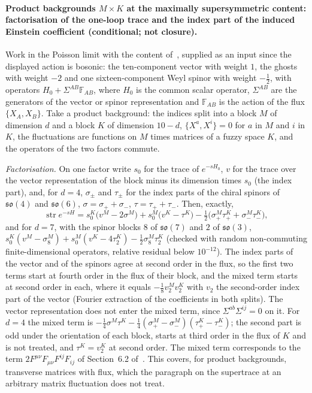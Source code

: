 \paragraph{Product backgrounds \(M\times K\) at the maximally supersymmetric content: factorisation of the one-loop trace and the index part of the induced Einstein coefficient (conditional; not closure).}
Work in the Poisson limit with the content of~\cite{IKKT1997}, supplied as an input since the displayed action is bosonic: the ten-component vector with weight \(1\), the ghosts with weight \(-2\) and one sixteen-component Weyl spinor with weight \(-\tfrac12\), with operators \(H_0+\Sigma^{AB}\mathbb F_{AB}\), where \(H_0\) is the common scalar operator, \(\Sigma^{AB}\) are the generators of the vector or spinor representation and \(\mathbb F_{AB}\) is the action of the flux \(\{X_A,X_B\}\). Take a product background: the indices split into a block \(M\) of dimension \(d\) and a block \(K\) of dimension \(10-d\), \(\{X^a,X^i\}=0\) for \(a\) in \(M\) and \(i\) in \(K\), the fluctuations are functions on \(M\) times matrices of a fuzzy space \(K\), and the operators of the two factors commute.

\emph{Factorisation.} On one factor write \(s_0\) for the trace of \(e^{-sH_0}\), \(v\) for the trace over the vector representation of the block minus its dimension times \(s_0\) (the index part), and, for \(d=4\), \(\sigma_\pm\) and \(\tau_\pm\) for the index parts of the chiral spinors of \(\mathfrak{so}(4)\) and \(\mathfrak{so}(6)\), \(\sigma=\sigma_++\sigma_-\), \(\tau=\tau_++\tau_-\). Then, exactly,
\[
  \operatorname{str}e^{-sH}=s_0^K\bigl(v^M-2\sigma^M\bigr)+s_0^M\bigl(v^K-\tau^K\bigr)-\tfrac12\bigl(\sigma_+^M\tau_+^K+\sigma_-^M\tau_-^K\bigr),
\]
and for \(d=7\), with the spinor blocks \(8\) of \(\mathfrak{so}(7)\) and \(2\) of \(\mathfrak{so}(3)\), \(s_0^K(v^M-\sigma_8^M)+s_0^M(v^K-4\tau_2^K)-\tfrac12\sigma_8^M\tau_2^K\) (checked with random non-commuting finite-dimensional operators, relative residual below \(10^{-12}\)). The index parts of the vector and of the spinors agree at second order in the flux, so the first two terms start at fourth order in the flux of their block, and the mixed term starts at second order in each, where it equals \(-\tfrac18v_2^Mv_2^K\) with \(v_2\) the second-order index part of the vector (Fourier extraction of the coefficients in both splits). The vector representation does not enter the mixed term, since \(\Sigma^{ab}\Sigma^{ij}=0\) on it. For \(d=4\) the mixed term is \(-\tfrac14\sigma^M\tau^K-\tfrac14(\sigma_+^M-\sigma_-^M)(\tau_+^K-\tau_-^K)\); the second part is odd under the orientation of each block, starts at third order in the flux of \(K\) and is not treated, and \(\tau^K=v_2^K\) at second order. The mixed term corresponds to the term \(2F^{\mu\nu}F_{\mu\nu}F^{ij}F_{ij}\) of Section~6.2 of~\cite{Steinacker2023}. This covers, for product backgrounds, transverse matrices with flux, which the paragraph on the supertrace at an arbitrary matrix fluctuation does not treat.

